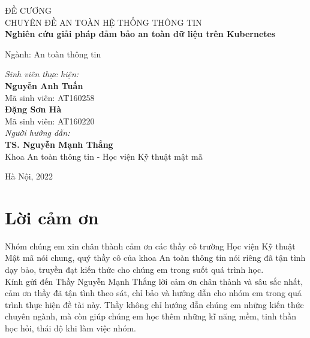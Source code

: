 \documentclass[12pt,a4paper]{report}
\begin{document}
\begin{titlepage}
		\begin{center}
			{\Huge ĐỀ CƯƠNG\\}
			{\large CHUYÊN ĐỀ AN TOÀN HỆ THỐNG THÔNG TIN\\}
			\textbf{Nghiên cứu giải pháp đảm bảo an toàn dữ liệu trên Kubernetes}
		\end{center}
		\bigskip
		\begin{flushright}
			\large{Ngành: An toàn thông tin}
		\end{flushright}
		\vspace{30mm}
		\begin{flushleft}
			\textit{Sinh viên thực hiện:}\\
			\textbf{Nguyễn Anh Tuấn}\\
			Mã sinh viên: AT160258\\
			\textbf{Đặng Sơn Hà}\\
			Mã sinh viên: AT160220
			\bigskip\\
			\textit{Người hướng dẫn:}\\
			\textbf{TS. Nguyễn Mạnh Thắng}\\
			Khoa An toàn thông tin - Học viện Kỹ thuật mật mã
		\end{flushleft}
		\vfill
		\begin{center}
			Hà Nội, 2022
		\end{center}
		
	\end{titlepage}
	
	\tableofcontents
	
	\chapter*{\centering Lời cảm ơn}
	\hspace{1cm}Nhóm chúng em xin chân thành cảm ơn các thầy cô trường Học viện Kỹ thuật Mật mã nói chung, quý thầy cô của khoa An toàn thông tin nói riêng đã tận tình dạy bảo, truyền đạt kiến thức cho chúng em trong suốt quá trình học.\\
	
	\hspace{1cm} Kính gửi đến Thầy Nguyễn Mạnh Thắng lời cảm ơn chân thành và sâu sắc nhất, cảm ơn thầy đã tận tình theo sát, chỉ bảo và hướng dẫn cho nhóm em trong quá trình thực hiện đề tài này. Thầy không chỉ hướng dẫn chúng em những kiến thức chuyên ngành, mà còn giúp chúng em học thêm những kĩ năng mềm, tinh thần học hỏi, thái độ khi làm việc nhóm.\\
	
\end{document}
